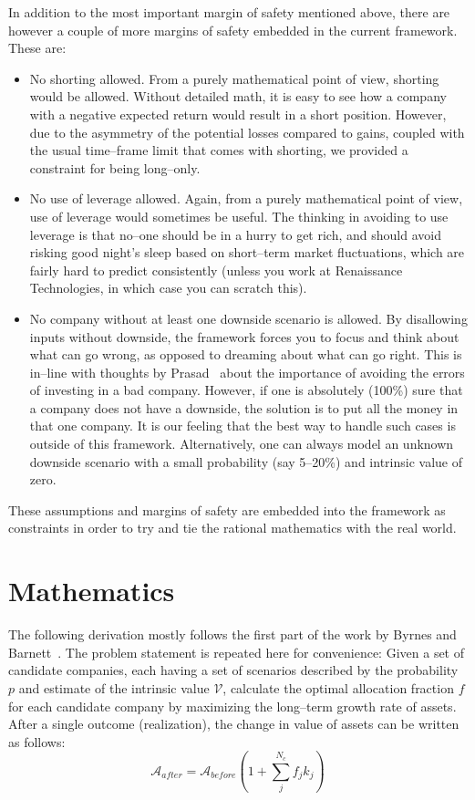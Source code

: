 \documentclass{article}
\begin{document}
In addition to the most important margin of safety mentioned above, there are
however a couple of more margins of safety embedded in the current framework.
These are:
\begin{itemize}
    \item No shorting allowed. From a purely mathematical point of view,
    shorting would be allowed. Without detailed math, it is easy to see how a
    company with a negative expected return would result in a short position.
    However, due to the asymmetry of the potential losses compared to gains,
    coupled with the usual time--frame limit that comes with shorting, we
    provided a constraint for being long--only.
    \item No use of leverage allowed. Again, from a purely mathematical point of
    view, use of leverage would sometimes be useful. The thinking in avoiding to
    use leverage is that no--one should be in a hurry to get rich, and should
    avoid risking good night's sleep based on short--term market fluctuations,
    which are fairly hard to predict consistently (unless you work at
    Renaissance Technologies, in which case you can scratch this).
    \item No company without at least one downside scenario is allowed. By
    disallowing inputs without downside, the framework forces you to focus and
    think about what can go wrong, as opposed to dreaming about what can go
    right. This is in--line with thoughts by Prasad~\cite{darwinInvesting} about
    the importance of avoiding the errors of investing in a bad company.
    However, if one is absolutely (100\%) sure that a company does not have a
    downside, the solution is to put all the money in that one company.  It is
    our feeling that the best way to handle such cases is outside of this
    framework. Alternatively, one can always model an unknown downside scenario
    with a small probability (say 5--20\%) and intrinsic value of zero.
\end{itemize}

These assumptions and margins of safety are embedded into the framework as
constraints in order to try and tie the rational mathematics with the real
world.

\section{Mathematics}
\label{sec:mathematics}

The following derivation mostly follows the first part of the work by Byrnes and
Barnett~\cite{byrnesBarnett}. The problem statement is repeated here for
convenience: Given a set of candidate companies, each having a set of scenarios
described by the probability $p$ and estimate of the intrinsic value
$\mathcal{V}$, calculate the optimal allocation fraction $f$ for each candidate
company by maximizing the long--term growth rate of assets. After a single
outcome (realization), the change in value of assets can be written as follows:
\begin{equation}
\label{eq:1}
    \mathcal{A}_{after}
  = 
    \mathcal{A}_{before}
    \left( 1 + \sum_{j}^{N_c} f_j k_j \right)
\end{equation} 
\end{document}
